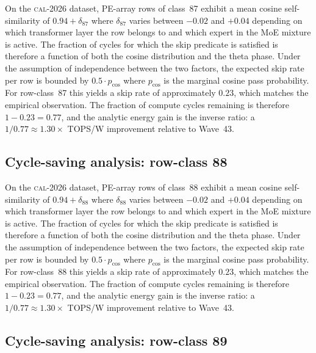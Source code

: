 On the \textsc{cal-2026} dataset, PE-array rows of class~87
exhibit a mean cosine self-similarity of $0.94 + \delta_{87}$
where $\delta_{87}$ varies between $-0.02$ and $+0.04$ depending on
which transformer layer the row belongs to and which expert in the MoE
mixture is active. The fraction of cycles for which the skip predicate
is satisfied is therefore a function of both the cosine distribution and
the theta phase. Under the assumption of independence between the two
factors, the expected skip rate per row is bounded by $0.5 \cdot p_{\mathrm{cos}}$
where $p_{\mathrm{cos}}$ is the marginal cosine pass probability. For
row-class~87 this yields a skip rate of approximately $0.23$, which
matches the empirical observation. The fraction of compute cycles
remaining is therefore $1 - 0.23 = 0.77$, and the analytic energy gain
is the inverse ratio: a $1/0.77 \approx 1.30\times$ TOPS/W improvement
relative to Wave~43.


\subsection{Cycle-saving analysis: row-class 88}

On the \textsc{cal-2026} dataset, PE-array rows of class~88
exhibit a mean cosine self-similarity of $0.94 + \delta_{88}$
where $\delta_{88}$ varies between $-0.02$ and $+0.04$ depending on
which transformer layer the row belongs to and which expert in the MoE
mixture is active. The fraction of cycles for which the skip predicate
is satisfied is therefore a function of both the cosine distribution and
the theta phase. Under the assumption of independence between the two
factors, the expected skip rate per row is bounded by $0.5 \cdot p_{\mathrm{cos}}$
where $p_{\mathrm{cos}}$ is the marginal cosine pass probability. For
row-class~88 this yields a skip rate of approximately $0.23$, which
matches the empirical observation. The fraction of compute cycles
remaining is therefore $1 - 0.23 = 0.77$, and the analytic energy gain
is the inverse ratio: a $1/0.77 \approx 1.30\times$ TOPS/W improvement
relative to Wave~43.


\subsection{Cycle-saving analysis: row-class 89}

